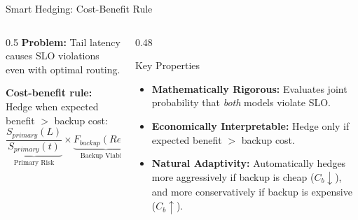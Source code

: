 \documentclass[aspectratio=169,10pt]{beamer}
\begin{document}
\begin{frame}{Smart Hedging: Cost-Benefit Rule}
\vspace{-0.3cm}
\begin{columns}[T]
\begin{column}{0.5\textwidth}
\scriptsize
\textbf{Problem:} Tail latency causes SLO violations even with optimal routing.

\vspace{0.1cm}
\textbf{Cost-benefit rule:} Hedge when expected benefit $>$ backup cost:
$$\underbrace{\frac{S_{primary}(L)}{S_{primary}(t)}}_{\text{Primary Risk}} \times \underbrace{F_{backup}(Rem)}_{\text{Backup Viability}} > \underbrace{\frac{C_b}{V}}_{\text{Cost Ratio}}$$

\vspace{0.1cm}
\centering
{}
\end{column}

\begin{column}{0.48\textwidth}
\scriptsize
\begin{exampleblock}{Key Properties}
\begin{itemize}\setlength{\itemsep}{1pt}
    \item \textbf{Mathematically Rigorous:} Evaluates joint probability that \textit{both} models violate SLO.
    \item \textbf{Economically Interpretable:} Hedge only if expected benefit $>$ backup cost.
    \item \textbf{Natural Adaptivity:} Automatically hedges more aggressively if backup is cheap ($C_b \downarrow$), and more conservatively if backup is expensive ($C_b \uparrow$).
\end{itemize}
\end{exampleblock}


\end{column}
\end{columns}
\end{frame}
\end{document}
